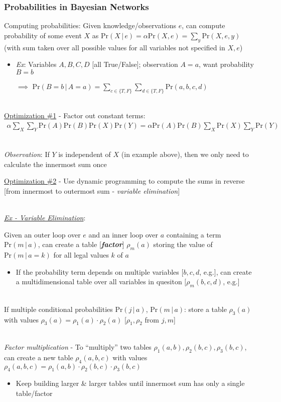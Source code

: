 \documentclass[12pt]{extarticle}
\theoremstyle{definition}
\theoremstyle{remark}
\newcommand{\pstart}[0]{\noindent}
\newcommand{\newp}[0]{~\\ \pstart}
\newcommand{\term}[1]{\noindent\textbf{\textit{#1}}}
\newcommand{\prob}[1]{\text{Pr}(#1)}
\newcommand{\cond}[2]{#1\,\vert\,#2}
\begin{document}
\subsubsection{Probabilities in Bayesian Networks}
Computing probabilities: Given knowledge/observations $e$, can compute probability of some event $X$ as $\prob{\cond{X}{e}}=\alpha\prob{X,e}=\sum_y \prob{X,e,y}$ (with sum taken over all possible values for all variables not specified in $X,e$) \begin{itemize}
    \item \textit{Ex}: Variables $A,B,C,D$ [all True/False]; observation $A=a$, want probability $B=b$

    $\implies$ $\prob{\cond{B=b}{A=a}}=\sum_{c\in\{T,F\}}\sum_{d\in\{T,F\}}\prob{a,b,c,d}$
\end{itemize}

\newp
\ul{Optimization \#1} - Factor out constant terms: \begin{align*}
    \alpha\sum_X\sum_Y \prob{A}\prob{B}\prob{X}\prob{Y}=\alpha\prob{A}\prob{B}\sum_X\prob{X}\sum_Y\prob{Y}
\end{align*}

\newp
\textit{Observation}: If $Y$ is independent of $X$ (in example above), then we only need to calculate the innermost sum once

\vspace{6pt}\pstart
\ul{Optimization \#2} - Use dynamic programming to compute the sums in reverse [from innermost to outermost sum - \textit{variable elimination}]

\newp
\ul{\textit{Ex - Variable Elimination}}:

\vspace{4pt}\pstart
Given an outer loop over $e$ and an inner loop over $a$ containing a term $\prob{\cond{m}{a}}$, can create a table [\term{factor}] $\rho_m(a)$ storing the value of $\prob{\cond{m}{a=k}}$ for all legal values $k$ of $a$ \begin{itemize}
    \item If the probability term depends on multiple variables [$b,c,d$, e.g.], can create a multidimensional table over all variables in quesiton $[\rho_{m}(b,c,d)$, e.g.]
\end{itemize}

\newp
If multiple conditional probabilities $\prob{\cond{j}{a}}$, $\prob{\cond{m}{a}}$: store a table $\rho_3(a)$ with values $\rho_3(a)=\rho_1(a)\cdot\rho_2(a)$ [$\rho_1,\rho_2$ from $j,m$]


\newp
\textit{Factor multiplication} - To ``multiply'' two tables $\rho_1(a,b), \rho_2(b,c),\rho_3(b,c)$, can create a new table $\rho_4(a,b,c)$ with values $\rho_4(a,b,c)=\rho_1(a,b)\cdot\rho_2(b,c)\cdot\rho_3(b,c)$ \begin{itemize}
    \item Keep building larger \& larger tables until innermost sum has only a single table/factor
\end{itemize}
\end{document}
